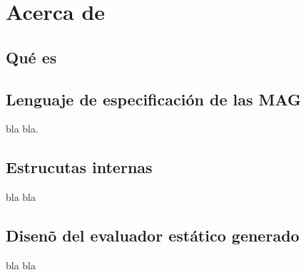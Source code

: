 \chapter{Acerca de \maggen}
\label{chap:disen_}
\minitoc


\section{Qu\'e es \maggen}

\section{Lenguaje de especificaci\'on de las MAG}

bla bla.


\section{Estrucutas internas}
bla bla

\section{Disen\~o del evaluador est\'atico generado}

bla bla
